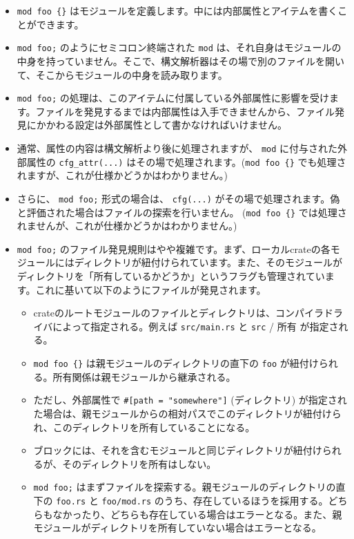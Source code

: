\documentclass[dvipdfmx,uplatex,papersize,a4paper,10pt]{jsbook}
\theoremstyle{definition}
\begin{document}
\begin{itemize}
  \item \verb|mod foo {}| はモジュールを定義します。中には内部属性とアイテムを書くことができます。
  \item \verb|mod foo;| のようにセミコロン終端された \verb|mod| は、それ自身はモジュールの中身を持っていません。そこで、構文解析器はその場で別のファイルを開いて、そこからモジュールの中身を読み取ります。
  \item \verb|mod foo;| の処理は、このアイテムに付属している外部属性に影響を受けます。ファイルを発見するまでは内部属性は入手できませんから、ファイル発見にかかわる設定は外部属性として書かなければいけません。
  \item 通常、属性の内容は構文解析より後に処理されますが、 \verb|mod| に付与された外部属性の \verb|cfg_attr(...)| はその場で処理されます。(\verb|mod foo {}| でも処理されますが、これが仕様かどうかはわかりません。)
  \item さらに、 \verb|mod foo;| 形式の場合は、 \verb|cfg(...)| がその場で処理されます。偽と評価された場合はファイルの探索を行いません。 (\verb|mod foo {}| では処理されませんが、これが仕様かどうかはわかりません。)
  \item \verb|mod foo;| のファイル発見規則はやや複雑です。まず、ローカルcrateの各モジュールにはディレクトリが紐付けられています。また、そのモジュールがディレクトリを「所有しているかどうか」というフラグも管理されています。これに基いて以下のようにファイルが発見されます。
    \begin{itemize}
      \item crateのルートモジュールのファイルとディレクトリは、コンパイラドライバによって指定される。例えば \verb|src/main.rs| と \verb|src| / 所有 が指定される。
      \item \verb|mod foo {}| は親モジュールのディレクトリの直下の \verb|foo| が紐付けられる。所有関係は親モジュールから継承される。
      \item ただし、外部属性で \verb|#[path = "somewhere"]| (ディレクトリ) が指定された場合は、親モジュールからの相対パスでこのディレクトリが紐付けられ、このディレクトリを所有していることになる。
      \item ブロックには、それを含むモジュールと同じディレクトリが紐付けられるが、そのディレクトリを所有はしない。
      \item \verb|mod foo;| はまずファイルを探索する。親モジュールのディレクトリの直下の \verb|foo.rs| と \verb|foo/mod.rs| のうち、存在しているほうを採用する。どちらもなかったり、どちらも存在している場合はエラーとなる。また、親モジュールがディレクトリを所有していない場合はエラーとなる。

\end{itemize}
\end{itemize}
\end{document}
